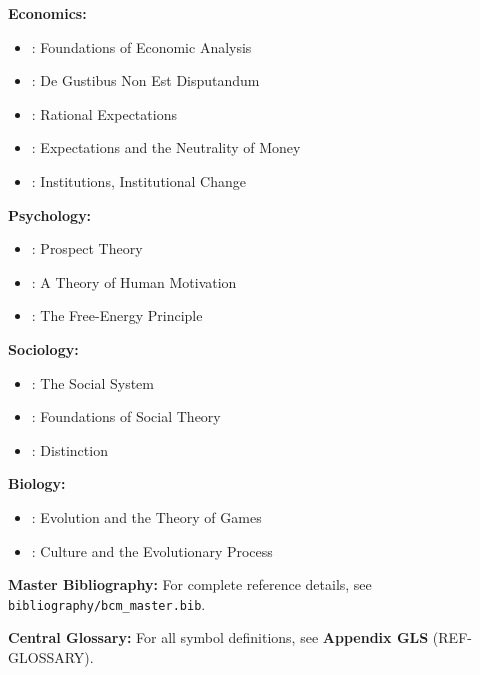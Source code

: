 \textbf{Economics:}
\begin{itemize}[nosep]
    \item \citet{samuelson1947}: Foundations of Economic Analysis
    \item \citet{stiglerbecker1977}: De Gustibus Non Est Disputandum
    \item \citet{muth1961}: Rational Expectations
    \item \citet{lucas1972}: Expectations and the Neutrality of Money
    \item \citet{north1990}: Institutions, Institutional Change
\end{itemize}

\textbf{Psychology:}
\begin{itemize}[nosep]
    \item \citet{kahnemantversky1979}: Prospect Theory
    \item \citet{maslow1943}: A Theory of Human Motivation
    \item \citet{friston2010}: The Free-Energy Principle
\end{itemize}

\textbf{Sociology:}
\begin{itemize}[nosep]
    \item \citet{parsons1951}: The Social System
    \item \citet{coleman1990}: Foundations of Social Theory
    \item \citet{bourdieu1984}: Distinction
\end{itemize}

\textbf{Biology:}
\begin{itemize}[nosep]
    \item \citet{maynardsmith1982}: Evolution and the Theory of Games
    \item \citet{boydricherson}: Culture and the Evolutionary Process
\end{itemize}

\begin{tcolorbox}[colback=blue!5!white, colframe=blue!75!black]
\textbf{Master Bibliography:} For complete reference details, see
\texttt{bibliography/bcm\_master.bib}.

\textbf{Central Glossary:} For all symbol definitions, see
\textbf{Appendix GLS} (REF-GLOSSARY).
\end{tcolorbox}



